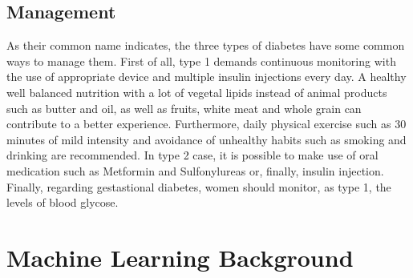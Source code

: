 \documentclass[journal,article,submit,pdftex,moreauthors]{Definitions/mdpi}
\begin{document}
\subsection{Management}
As their common name indicates, the three types of diabetes have some common ways to manage them. First of all, type 1 demands
continuous monitoring with  the use of appropriate device and multiple insulin injections every day. A healthy well
balanced  nutrition with a lot of vegetal lipids instead of animal products such as  butter and oil, as well as fruits, white meat 
and whole grain can contribute to a better experience. Furthermore, daily physical exercise such as 30 minutes of mild intensity
and avoidance of unhealthy habits such as smoking and drinking are recommended. In type 2 case, it is possible to make use
of oral medication such as Metformin and Sulfonylureas or, finally, insulin injection. Finally, regarding gestastional diabetes, 
women should monitor, as type 1, the levels of blood glycose.


\section{Machine Learning Background}
\end{document}
